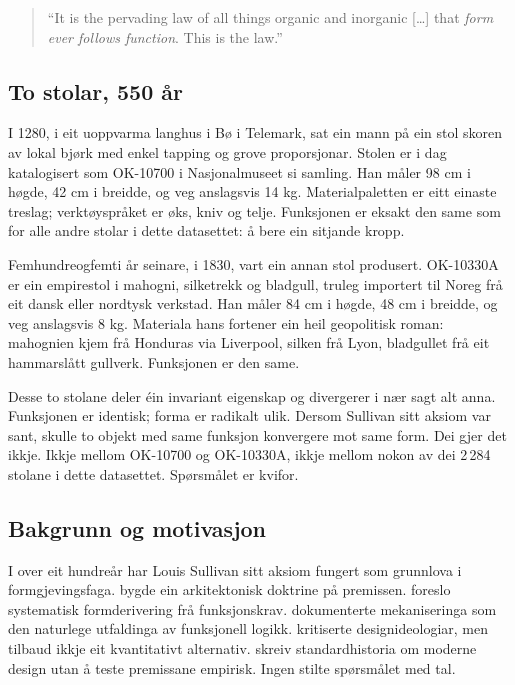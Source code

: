 \documentclass[12pt, a4paper]{article}
\begin{document}
\begin{quote}
``It is the pervading law of all things organic and inorganic [\ldots] that \emph{form ever follows function}. This is the law.'' \citep{sullivan1896}
\end{quote}

\subsection{To stolar, 550 år}

I 1280, i eit uoppvarma langhus i Bø i Telemark, sat ein mann på ein stol skoren av lokal bjørk med enkel tapping og grove proporsjonar. Stolen er i dag katalogisert som OK-10700 i Nasjonalmuseet si samling. Han måler 98 cm i høgde, 42 cm i breidde, og veg anslagsvis 14 kg. Materialpaletten er eitt einaste treslag; verktøyspråket er øks, kniv og telje. Funksjonen er eksakt den same som for alle andre stolar i dette datasettet: å bere ein sitjande kropp.

Femhundreogfemti år seinare, i 1830, vart ein annan stol produsert. OK-10330A er ein empirestol i mahogni, silketrekk og bladgull, truleg importert til Noreg frå eit dansk eller nordtysk verkstad. Han måler 84 cm i høgde, 48 cm i breidde, og veg anslagsvis 8 kg. Materiala hans fortener ein heil geopolitisk roman: mahognien kjem frå Honduras via Liverpool, silken frå Lyon, bladgullet frå eit hammarslått gullverk. Funksjonen er den same.

Desse to stolane deler éin invariant eigenskap og divergerer i nær sagt alt anna. Funksjonen er identisk; forma er radikalt ulik. Dersom Sullivan sitt aksiom var sant, skulle to objekt med same funksjon konvergere mot same form. Dei gjer det ikkje. Ikkje mellom OK-10700 og OK-10330A, ikkje mellom nokon av dei 2\,284 stolane i dette datasettet. Spørsmålet er kvifor.

\subsection{Bakgrunn og motivasjon}

I over eit hundreår har Louis Sullivan sitt aksiom fungert som grunnlova i formgjevingsfaga. \citet{lecorbusier1923} bygde ein arkitektonisk doktrine på premissen. \citet{alexander1964} foreslo systematisk formderivering frå funksjonskrav. \citet{giedion1948} dokumenterte mekaniseringa som den naturlege utfaldinga av funksjonell logikk. \citet{forty1986} kritiserte designideologiar, men tilbaud ikkje eit kvantitativt alternativ. \citet{raizman2010} skreiv standardhistoria om moderne design utan å teste premissane empirisk. Ingen stilte spørsmålet med tal.
\end{document}
